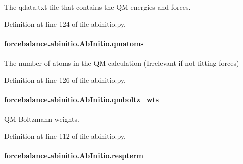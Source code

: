 The qdata.\-txt file that contains the Q\-M energies and forces. 



Definition at line 124 of file abinitio.\-py.

\hypertarget{classforcebalance_1_1abinitio_1_1AbInitio_af0760b8d33ce9dd044ccbe68fba7a1be}{
\paragraph[{qmatoms}]{\setlength{\rightskip}{0pt plus 5cm}forcebalance.\-abinitio.\-Ab\-Initio.\-qmatoms}}\label{classforcebalance_1_1abinitio_1_1AbInitio_af0760b8d33ce9dd044ccbe68fba7a1be}


The number of atoms in the Q\-M calculation (Irrelevant if not fitting forces) 



Definition at line 126 of file abinitio.\-py.

\hypertarget{classforcebalance_1_1abinitio_1_1AbInitio_a06ec6b12d81791ca94f599f41e56335a}{
\paragraph[{qmboltz\-\_\-wts}]{\setlength{\rightskip}{0pt plus 5cm}forcebalance.\-abinitio.\-Ab\-Initio.\-qmboltz\-\_\-wts}}\label{classforcebalance_1_1abinitio_1_1AbInitio_a06ec6b12d81791ca94f599f41e56335a}


Q\-M Boltzmann weights. 



Definition at line 112 of file abinitio.\-py.

\hypertarget{classforcebalance_1_1abinitio_1_1AbInitio_a689e3849518b33539442a473a41ed32d}{
\paragraph[{respterm}]{\setlength{\rightskip}{0pt plus 5cm}forcebalance.\-abinitio.\-Ab\-Initio.\-respterm}}\label{classforcebalance_1_1abinitio_1_1AbInitio_a689e3849518b33539442a473a41ed32d}


